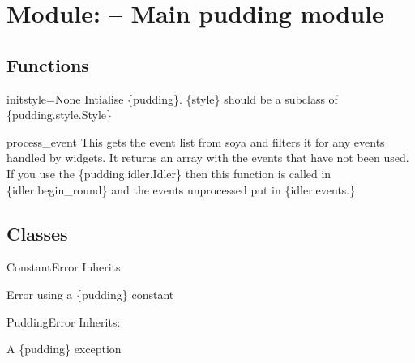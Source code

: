 \section{Module:  -- Main pudding module}
\subsection{Functions}
\begin{funcdesc}{init}{style=None}
Intialise \module\{pudding\}. \var\{style\} should be a subclass of 
\class\{pudding.style.Style\}
\end{funcdesc}

\begin{funcdesc}{process_event}{}
This gets the event list from soya and filters it for any events handled 
by widgets. It returns an array with the events that have not been used. 
If you use the \class\{pudding.idler.Idler\} then this function is called in 
\method\{idler.begin\_round\} and the events unprocessed put in 
\var\{idler.events.\}
\end{funcdesc}

\subsection{Classes}
\begin{excdesc}{ConstantError}
Inherits:

Error using a \module\{pudding\} constant

\end{excdesc}

\begin{excdesc}{PuddingError}
Inherits:

A \module\{pudding\} exception

\end{excdesc}

